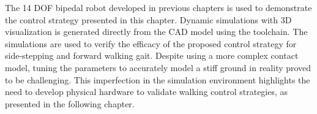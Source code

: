 The 14 DOF bipedal robot developed in previous chapters is used to demonstrate the control strategy presented in this chapter. Dynamic simulations with 3D visualization is generated directly from the CAD model using the toolchain. The simulations are used to verify the efficacy of the proposed control strategy for side-stepping and forward walking gait. Despite using a more complex contact model, tuning the parameters to accurately model a stiff ground in reality proved to be challenging. This imperfection in the simulation environment highlights the need to develop physical hardware to validate walking control strategies, as presented in the following chapter.


